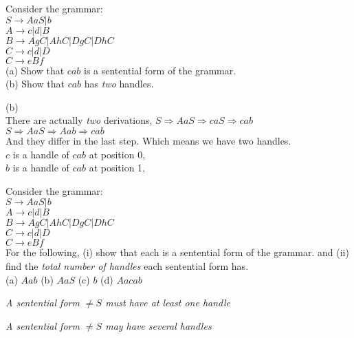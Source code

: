 \frmrule 

\begin{example}
Consider the grammar:\\
$S \rightarrow AaS | b$ \\
$A \rightarrow c | d | B$ \\
$B \rightarrow AgC | AhC | DgC | DhC$ \\
$C \rightarrow c | d | D $ \\
$C \rightarrow eBf $ \\
(a) Show that $cab$ is a sentential form of the grammar. \\
(b) Show that $cab$ has \textit{two} handles. 
\end{example}

\frmrule 

(b) \\
There are actually \textit{two} derivations, 
$S \Rightarrow AaS \Rightarrow caS \Rightarrow cab$\\
$S \Rightarrow AaS \Rightarrow Aab \Rightarrow cab$\\
And they differ in the last step. Which means we have two handles. \\
$c$ is a handle of $cab$ at position 0, \\
$b$ is a handle of $cab$ at position 1, 

\frmrule 

\begin{example}
Consider the grammar:\\
$S \rightarrow AaS | b$ \\
$A \rightarrow c | d | B$ \\
$B \rightarrow AgC | AhC | DgC | DhC$ \\
$C \rightarrow c | d | D $ \\
$C \rightarrow eBf $ \\
For the following, (i) show that each is a sentential form of the grammar.
and (ii) find the \textit{total number of handles} each sentential form has. \\
(a) $Aab$ (b) $AaS$ (c) $b$  (d) $Aacab$
\end{example}



\frmrule 

\textit{A sentential form $\neq S$ must have at least one handle}




\frmrule 

\textit{A sentential form $\neq S$ may have several handles}

